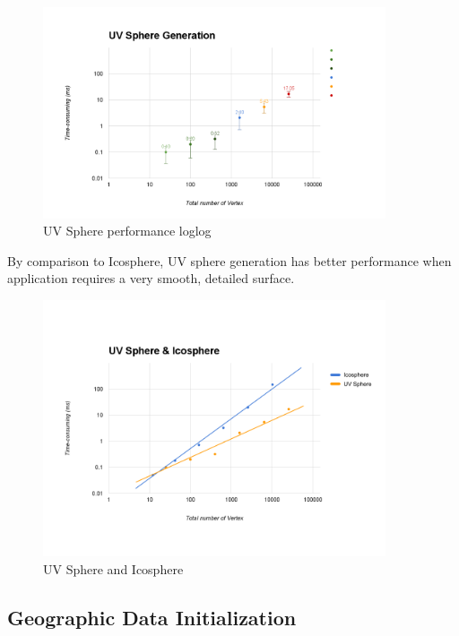 \begin{figure}[H]
	\caption{UV Sphere performance loglog}
	\label{fig:uv-sphere-performance-loglog}
	\centering
	\includegraphics[width=0.9\textwidth, keepaspectratio]{Figures/uv-sphere-performance-loglog.png}
	\decoRule
\end{figure}

By comparison to Icosphere, UV sphere generation has better performance when application requires a very smooth, detailed surface.

\begin{figure}[H]
	\caption{UV Sphere and Icosphere}
	\label{fig:uv-sphere-and-icosphere}
	\centering
	\includegraphics[width=0.9\textwidth, keepaspectratio]{Figures/uv-sphere-and-icosphere.png}
	\decoRule
\end{figure}

\subsection{Geographic Data Initialization}

